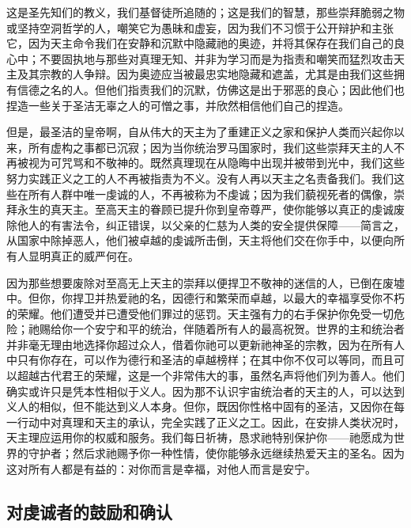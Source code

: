 这是圣先知们的教义，我们基督徒所追随的；这是我们的智慧，那些崇拜脆弱之物或坚持空洞哲学的人，嘲笑它为愚昧和虚妄，因为我们不习惯于公开辩护和主张它，因为天主命令我们在安静和沉默中隐藏祂的奥迹，并将其保存在我们自己的良心中；不要固执地与那些对真理无知、并非为学习而是为指责和嘲笑而猛烈攻击天主及其宗教的人争辩。因为奥迹应当被最忠实地隐藏和遮盖，尤其是由我们这些拥有信德之名的人。但他们指责我们的沉默，仿佛这是出于邪恶的良心；因此他们也捏造一些关于圣洁无辜之人的可憎之事，并欣然相信他们自己的捏造。\par

\par

但是，最圣洁的皇帝啊，自从伟大的天主为了重建正义之家和保护人类而兴起你以来，所有虚构之事都已沉寂；因为当你统治罗马国家时，我们这些崇拜天主的人不再被视为可咒骂和不敬神的。既然真理现在从隐晦中出现并被带到光中，我们这些努力实践正义之工的人不再被指责为不义。没有人再以天主之名责备我们。我们这些在所有人群中唯一虔诚的人，不再被称为不虔诚；因为我们藐视死者的偶像，崇拜永生的真天主。至高天主的眷顾已提升你到皇帝尊严，使你能够以真正的虔诚废除他人的有害法令，纠正错误，以父亲的仁慈为人类的安全提供保障——简言之，从国家中除掉恶人，他们被卓越的虔诚所击倒，天主将他们交在你手中，以便向所有人显明真正的威严何在。\par

因为那些想要废除对至高无上天主的崇拜以便捍卫不敬神的迷信的人，已倒在废墟中。但你，你捍卫并热爱祂的名，因德行和繁荣而卓越，以最大的幸福享受你不朽的荣耀。他们遭受并已遭受他们罪过的惩罚。天主强有力的右手保护你免受一切危险；祂赐给你一个安宁和平的统治，伴随着所有人的最高祝贺。世界的主和统治者并非毫无理由地选择你超过众人，借着你祂可以更新祂神圣的宗教，因为在所有人中只有你存在，可以作为德行和圣洁的卓越榜样；在其中你不仅可以等同，而且可以超越古代君王的荣耀，这是一个非常伟大的事，虽然名声将他们列为善人。他们确实或许只是凭本性相似于义人。因为那不认识宇宙统治者的天主的人，可以达到义人的相似，但不能达到义人本身。但你，既因你性格中固有的圣洁，又因你在每一行动中对真理和天主的承认，完全实践了正义之工。因此，在安排人类状况时，天主理应运用你的权威和服务。我们每日祈祷，恳求祂特别保护你——祂愿成为世界的守护者；然后求祂赐予你一种性情，使你能够永远继续热爱天主的圣名。因为这对所有人都是有益的：对你而言是幸福，对他人而言是安宁。\par


\subsection{对虔诚者的鼓励和确认}

